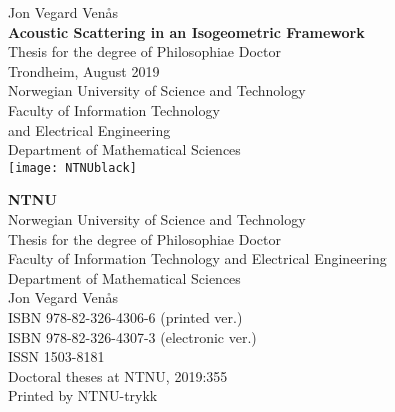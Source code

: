 \thispagestyle{empty}%
\begin{titlepage}
\begin{adjustwidth}{1.7cm}{1.7cm}
    \null%
    \raggedright%
    \LARGE\textcolor{black!60}{Jon Vegard Ven{\aa}s}\\
	\vspace{2cm}%
	\huge%
	\textbf{Acoustic Scattering in an Isogeometric Framework}\\
	\vspace{6.5cm}%
	\large%
	Thesis for the degree of Philosophiae Doctor\\
	\vspace{\baselineskip}%
	Trondheim, August 2019\\
	\vspace{\baselineskip}%
	Norwegian University of Science and Technology\\
	Faculty of Information Technology\\
	and Electrical Engineering\\
	Department of Mathematical Sciences\\
	\vspace*{1.7cm}%
	\texttt{[image: NTNUblack]}
\end{adjustwidth}        
\end{titlepage}
\newpage
\thispagestyle{empty}%
\begin{adjustwidth}{1.2cm}{1.2cm}
	\null\vspace{12cm}%
	\raggedright\footnotesize%
	\textbf{NTNU}\\
	Norwegian University of Science and Technology\\
	\vspace{\baselineskip}%
	Thesis for the degree of Philosophiae Doctor\\
	\vspace{\baselineskip}%
	Faculty of Information Technology and Electrical Engineering\\
	Department of Mathematical Sciences\\
	\vspace{\baselineskip}%
	\textcopyright\xspace Jon Vegard Ven{\aa}s\\
	\vspace{\baselineskip}%
	ISBN 978-82-326-4306-6 (printed ver.)\\
	ISBN 978-82-326-4307-3 (electronic ver.)\\
	ISSN 1503-8181\\
	\vspace{\baselineskip}%
	Doctoral theses at NTNU, 2019:355\\
	\vspace{\baselineskip}%
	Printed by NTNU-trykk
\end{adjustwidth}        